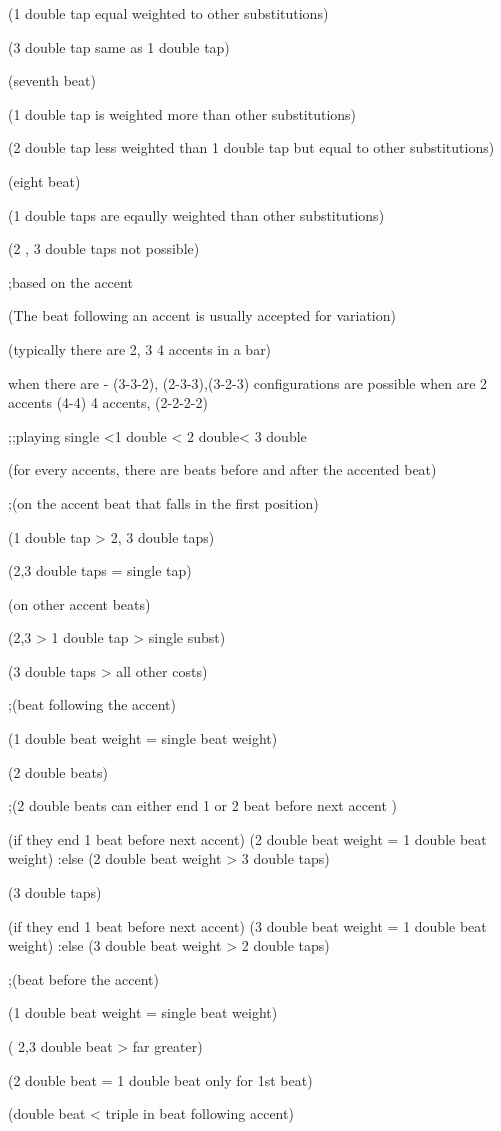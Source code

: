(1 double tap equal weighted to other substitutions)

(3 double tap same as 1 double tap)


(seventh beat)

(1 double tap is weighted more than other substitutions)

(2 double tap less weighted than 1 double tap but equal to other substitutions)


(eight beat)

(1 double taps are eqaully weighted than other substitutions)

(2 , 3 double taps not possible)


;based on the accent

(The beat following an accent is usually accepted for variation)

(typically there are 2, 3 4 accents in a bar)

when there are - (3-3-2), (2-3-3),(3-2-3) configurations are possible
when are 2 accents (4-4)
4 accents, (2-2-2-2)

;;playing single <1 double < 2 double< 3 double

(for every accents, there are beats before and after the accented beat)

;(on the accent beat that falls in the first position)

(1 double tap > 2, 3 double taps)

(2,3 double taps = single tap)

(on other accent beats)

(2,3 > 1 double tap > single subst)

(3 double taps > all other costs)

;(beat following the accent)

(1 double beat weight = single beat weight)

(2 double beats)

;(2 double beats can either end 1 or 2 beat before next accent )

(if they end 1 beat before next accent)
(2 double beat weight = 1 double beat weight)
:else (2 double beat weight > 3 double taps)

(3 double taps)

(if they end 1 beat before next accent)
(3 double beat weight = 1 double beat weight)
:else (3 double beat weight > 2 double taps)

;(beat before the accent)

(1 double beat weight = single beat weight)

( 2,3 double beat > far greater)



(2 double beat = 1 double beat only for 1st beat)


(double beat < triple in beat following accent)

